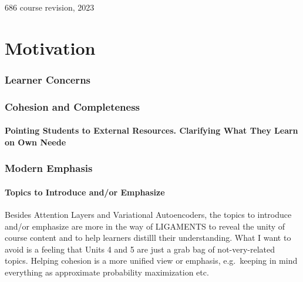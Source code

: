 \documentclass[12pt]{article}
\begin{document}
\begin{center}
  \huge
    686 course revision, 2023
\end{center}

\newcommand{\defined}[1]{\textbf{#1}}

\part{Motivation}
  \section*{\sc Learner Concerns}


  \section*{\sc Cohesion and Completeness}
    \subsection*{}
    \subsection*{}
    \subsection*{}
    \subsection*{}
    \subsection*{Pointing Students to External Resources.  Clarifying What They Learn on Own Neede}

  \section*{\sc Modern Emphasis}
    \subsection*{Topics to Introduce and/or Emphasize}
      Besides Attention Layers and Variational Autoencoders, the topics to
      introduce and/or emphasize are more in the way of LIGAMENTS to reveal the
      unity of course content and to help learners distilll their
      understanding.  What I want to avoid is a feeling that Units 4
      and 5 are just a grab bag of not-very-related topics.  Helping cohesion
      is a more unified view or emphasis, e.g.\ keeping in mind everything
      as approximate probability maximization etc.
\end{document}
